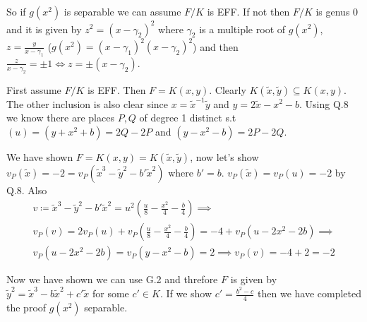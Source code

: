 \documentclass[12pt, a4paper]{article}
\begin{document}
So if $g(x^2)$ is separable we can assume $F/K$ is EFF. If not then $F/K$ is genus 0 and it is given by $z^2=(x-\gamma_2)^2$ where $\gamma_2$ is a multiple root of $g(x^2)$, $z = \frac{y}{x-\gamma_1}$ ($g(x^2)=(x-\gamma_1)^2(x-\gamma_2)^2$) and then $\frac{z}{x-\gamma_2} = \pm 1 \iff z = \pm (x-\gamma_2)$. 

First assume $F/K$ is EFF.
Then $F=K(x,y)$. Clearly $K(\tilde{x},\tilde{y}) \subseteq K(x,y)$. The other inclusion is also clear since $x = \tilde{x}^{-1}\tilde{y}$ and $y = 2\tilde{x}-x^2-b$. Using Q.8 we know there are places $P,Q$ of degree 1 distinct s.t $(u)=(y+x^2+b)=2Q-2P$ and $(y-x^2-b)=2P-2Q$.

We have shown $F=K(x,y)=K(\tilde{x},\tilde{y})$, now let's show $v_P(\tilde{x})=-2=v_P(\tilde{x}^3-\tilde{y}^2-b'\tilde{x}^2)$ where $b' = b$. $v_P(\tilde{x})=v_P(u)=-2$ by Q.8. Also
\begin{gather*}
v \coloneqq \tilde{x}^3-\tilde{y}^2-b'\tilde{x}^2 = u^2 \left(\frac{u}{8}-\frac{x^2}{4}-\frac{b}{4} \right) \implies \\
v_P(v)=2v_P(u)+v_P\left(\frac{u}{8}-\frac{x^2}{4}-\frac{b}{4} \right) = -4 + v_P(u - 2x^2 - 2b) \implies\\
 v_P(u - 2x^2 - 2b) = v_P(y-x^2-b) = 2 \implies v_P(v)=-4+2 = -2
\end{gather*}

Now we have shown we can use G.2 and threfore $F$ is given by $\tilde{y}^2=\tilde{x}^3-b\tilde{x}^2+c'\tilde{x}$ for some $c' \in K$. If we show $c' = \frac{b^2-c}{4}$ then we have completed the proof $g(x^2)$ separable.
\end{document}
